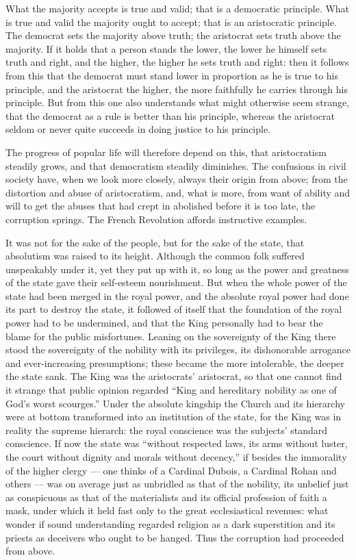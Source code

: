 \documentclass[12pt,a4paper,openany]{book}
\newcommand{\opage}[1]{\marginnote{\footnotesize\textit{[#1]}}}
\begin{document}
What the majority accepts is true and valid; that
is a democratic principle. What is true
and valid the majority ought to accept; that is an aristocratic
principle. The democrat sets the majority above truth;
the aristocrat sets truth above the majority.
If it holds that a person stands the lower, the
lower he himself sets truth and right, and the higher,
the higher he sets truth and right: then it follows
from this that the democrat must stand lower in proportion
as he is true to his principle, and the aristocrat the
higher, the more faithfully he carries through his principle.
But from this one also understands what might otherwise
seem strange, that the democrat as a rule is better
than his principle, whereas the aristocrat seldom or
never quite succeeds in doing justice to his principle.

\setcounter{footnote}{0}%
\opage{84}The progress of popular life will therefore depend on this, that
aristocratism steadily grows, and that democratism
steadily diminishes. The confusions in civil
society have, when we look more closely, always their origin
from above; from the distortion and abuse of
aristocratism, and, what is more, from want of ability
and will to get the abuses that had crept in abolished
before it is too late, the corruption springs. The
French Revolution affords instructive examples.

It was not for the sake of the people, but for the sake of the state,
that absolutism was raised to its height. Although the
common folk suffered unspeakably under it, yet they put up
with it, so long as the power and greatness of the state gave their
self-esteem nourishment. But when the whole power of the state had been merged
in the royal power, and the absolute royal power had
done its part to destroy the state, it followed of itself
that the foundation of the royal power had to be undermined,
and that the King personally had to bear the blame
for the public misfortunes. Leaning on the sovereignty of the King there stood
the sovereignty of the nobility with its privileges, its dishonorable
arrogance and ever-increasing presumptions; these became
the more intolerable, the deeper the state sank. The King was
the aristocrats' aristocrat, so that one cannot find it
strange that public opinion regarded ``King
and hereditary nobility as one of God's worst scourges.'' Under
the absolute kingship the Church and its hierarchy were
at bottom transformed into an institution of the state, for the King
was in reality the supreme hierarch: the royal
conscience was the subjects' standard conscience.
If now the state was ``without respected laws, its arms without
luster, the court without dignity and morals without decency,''
if besides the immorality of the higher clergy
\setcounter{footnote}{0}%
\opage{85}--- one thinks of a Cardinal Dubois, a Cardinal
Rohan and others --- was on average just as unbridled
as that of the nobility, its unbelief just as conspicuous as
that of the materialists and its official profession of faith a
mask, under which it held fast only to the great
ecclesiastical revenues: what wonder if sound understanding
regarded religion as a dark superstition and its
priests as deceivers who ought to be hanged. Thus the
corruption had proceeded from above.
\end{document}
